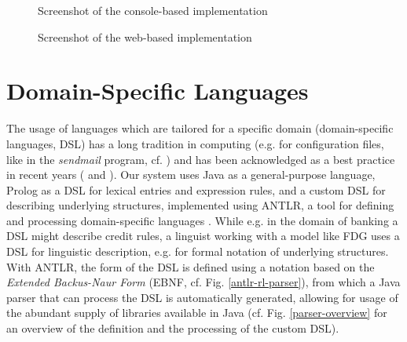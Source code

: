 \documentclass[a4paper, halfparskip, onecolumn, abstractoff, final]{scrartcl}
\begin{document}
\begin{figure}
\begin{center}
\end{center}
\caption{Screenshot of the console-based implementation} \label{console}
\end{figure}

\begin{figure}
\begin{center}
\end{center}
\caption{Screenshot of the web-based implementation} \label{web}
\end{figure}

\section{Domain-Specific Languages}\label{dsls}

The usage of languages which are tailored for a specific domain (domain-specific languages, DSL) has a long tradition in computing (e.g. for configuration files, like in the \emph{sendmail} program, cf. \citealt[Ch. 12]{HuntAndThomas1999}) and has been acknowledged as a best practice in recent years (\citealt[Ch. 12]{HuntAndThomas1999} and \citealt{Parr2007}). Our system uses Java as a general-purpose language, Prolog as a DSL for lexical entries and expression rules, and a custom DSL for describing underlying structures, implemented using ANTLR, a tool for defining and processing domain-specific languages \citep{Parr2007}. While e.g. in the domain of banking a DSL might describe credit rules, a linguist working with a model like FDG uses a DSL for linguistic description, e.g. for formal notation of underlying structures. With ANTLR, the form of the DSL is defined using a notation based on the \emph{Extended Backus-Naur Form} (EBNF, cf. Fig. \ref{antlr-rl-parser}), from which a Java parser that can process the DSL is automatically generated, allowing for usage of the abundant supply of libraries available in Java (cf. Fig. \ref{parser-overview} for an overview of the definition and the processing of the custom DSL).
\end{document}
